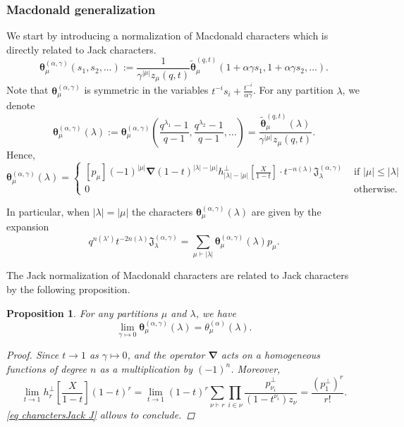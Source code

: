 \documentclass[12pt]{amsart}
\newtheorem{prop}[thm]{Proposition}
\theoremstyle{remark}
\newcommand{\MchJack}{{\boldsymbol{\theta}}^{(\alpha,\gamma)}}
\newcommand{\Mch}{\boldsymbol{\widetilde\theta}^{(q,t)}}
\newcommand{\JJack}{{\mathfrak J}^{(\alpha,\gamma)}}
\newcommand{\nablaJ}{\boldsymbol{\nabla}}
\begin{document}
\subsubsection{Macdonald generalization}

We start by introducing a normalization of Macdonald characters which is directly related to Jack characters.
\begin{equation}\label{eq def theta alpha u}
  \MchJack_\mu(s_1,s_2,\dots):=\frac{1}{\gamma^{|\mu|}z_\mu(q,t)}\Mch_\mu(1+\alpha \gamma s_1,1+\alpha \gamma s_2,\dots).  
\end{equation}
Note that $\MchJack_\mu$ is symmetric in the variables $t^{-i}s_i+\frac{t^{-i}}{\alpha \gamma}$.
For any partition $\lambda$, we denote 
\begin{equation}\label{eq def theta alpha gamma}
  \MchJack_\mu(\lambda):=\MchJack_\mu\left(\frac{q^{\lambda_1}-1}{q-1},\frac{q^{\lambda_2}-1}{q-1},\dots\right)=\frac{\Mch_\mu(\lambda)}{\gamma^{|\mu|}z_\mu(q,t)}.  
\end{equation}
Hence,
\begin{equation}\label{eq charactersJack J}
  \MchJack_\mu(\lambda)=\left\{
\begin{array}{cc}
      [p_\mu](-1)^{|\mu|} \nablaJ (1-t)^{|\lambda|-|\mu|} h^\perp_{|\lambda|-|\mu|}\left[\frac{X}{1-t}\right]\cdot t^{-n(\lambda)}\JJack_\lambda& \text{ if } |\mu|\leq |\lambda| \\
    0  & \text{ otherwise.}
\end{array}\right.  
\end{equation}

In particular, when $|\lambda|=|\mu|$ the characters  $\MchJack_\mu(\lambda)$ are given by the expansion
\begin{equation}\label{eq JJack characters}
q^{n(\lambda')}t^{-2n(\lambda)}\JJack_\lambda=\sum_{\mu\vdash |\lambda|}\MchJack_\mu(\lambda) p_\mu.  
\end{equation}

The Jack normalization of Macdonald characters are related to Jack characters by the following proposition.
\begin{prop}\label{prop Jack characters}
For any partitions $\mu$ and $\lambda$, we have
    $$\lim_{\gamma\mapsto 0}\MchJack_\mu(\lambda)=\theta^{(\alpha)}_\mu(\lambda).$$
    \begin{proof}
Since $t\rightarrow1$ as $\gamma\mapsto0$, and the operator $\nablaJ$ acts on a homogeneous functions of degree $n$ as a multiplication by $(-1)^n$. Moreover,
$$\lim_{t\rightarrow 1}h_r^\perp\left[\frac{X}{1-t}\right](1-t)^{r}=\lim_{t\rightarrow 1}(1-t)^{r}\sum_{\nu\vdash r}\prod_{i\in\nu}\frac{p_{\nu_i}^\perp}{(1-t^{\nu_i})z_\nu}=\frac{(p_1^\perp)^r}{r!}.$$
\cref{eq charactersJack J} allows to conclude.\qedhere
\end{proof}
\end{prop}
\end{document}
